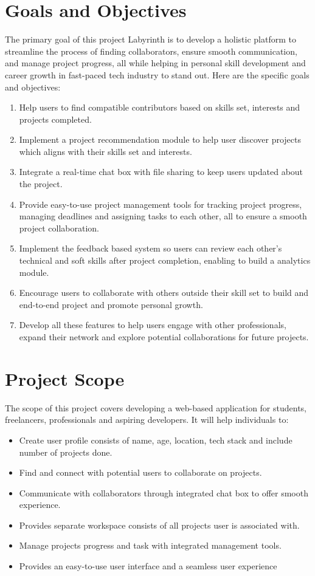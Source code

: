 \documentclass{FastFyp}
\begin{document}
\section{Goals and Objectives}
The primary goal of this project Labyrinth is to develop a holistic platform to streamline the process of finding collaborators, ensure smooth communication, and manage project progress, all while helping in personal skill development and career growth in fast-paced tech industry to stand out. Here are the specific goals and objectives:
\begin{enumerate}
    \item Help users to find compatible contributors based on skills set, interests and projects completed.
    \item Implement a project recommendation module to help user discover projects which aligns with their skills set and interests.
    \item Integrate a real-time chat box with file sharing to keep users updated about the project.
    \item  Provide easy-to-use project management tools for tracking project progress, managing deadlines and assigning tasks to each other, all to ensure a smooth project collaboration.
    \item Implement the feedback based system so users can review each other's technical and soft skills after project completion, enabling to build a analytics module.
    \item  Encourage users to collaborate with others outside their skill set to build and end-to-end project and promote personal growth.
    \item  Develop all these features to help users engage with other professionals, expand their network and explore potential collaborations for future projects.
\end{enumerate}
\section{Project Scope}
The scope of this project covers developing a web-based application for students, freelancers, professionals and aspiring developers. It will help individuals to:
\begin{itemize}
    \item Create user profile consists of name, age, location, tech stack and include number of projects done.
    \item Find and connect with potential users to collaborate on projects.
    \item Communicate with collaborators through integrated chat box to offer smooth experience.
    \item Provides separate workspace consists of all projects user is associated with.
    \item Manage projects progress and task with integrated management tools.
    \item Provides an easy-to-use user interface and a seamless user experience
\end{itemize}
\end{document}
